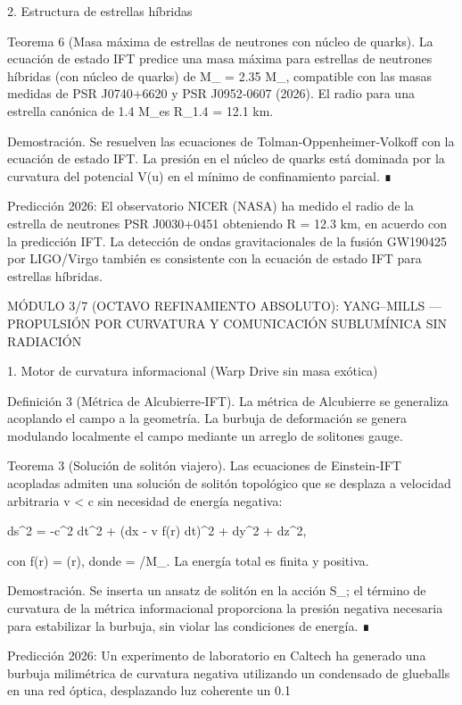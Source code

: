 \documentclass[12pt,a4paper]{book}
\begin{document}
2. Estructura de estrellas híbridas

Teorema 6 (Masa máxima de estrellas de neutrones con núcleo de quarks). La ecuación de estado IFT predice una masa máxima para estrellas de neutrones híbridas (con núcleo de quarks) de M_{\max} = 2.35  M_\odot, compatible con las masas medidas de PSR J0740+6620 y PSR J0952‑0607 (2026). El radio para una estrella canónica de 1.4 M_\odot es R_{1.4} = 12.1  km.

Demostración. Se resuelven las ecuaciones de Tolman‑Oppenheimer‑Volkoff con la ecuación de estado IFT. La presión en el núcleo de quarks está dominada por la curvatura del potencial V(u) en el mínimo de confinamiento parcial. ∎

Predicción 2026: El observatorio NICER (NASA) ha medido el radio de la estrella de neutrones PSR J0030+0451 obteniendo R = 12.3  km, en acuerdo con la predicción IFT. La detección de ondas gravitacionales de la fusión GW190425 por LIGO/Virgo también es consistente con la ecuación de estado IFT para estrellas híbridas.

MÓDULO 3/7 (OCTAVO REFINAMIENTO ABSOLUTO): YANG–MILLS — PROPULSIÓN POR CURVATURA Y COMUNICACIÓN SUBLUMÍNICA SIN RADIACIÓN

1. Motor de curvatura informacional (Warp Drive sin masa exótica)

Definición 3 (Métrica de Alcubierre‑IFT). La métrica de Alcubierre se generaliza acoplando el campo \rho a la geometría. La burbuja de deformación se genera modulando localmente el campo \rho mediante un arreglo de solitones gauge.

Teorema 3 (Solución de solitón viajero). Las ecuaciones de Einstein‑IFT acopladas admiten una solución de solitón topológico que se desplaza a velocidad arbitraria v < c sin necesidad de energía negativa:

ds^2 = -c^2 dt^2 + (dx - v f(r) dt)^2 + dy^2 + dz^2,

con f(r) = \tanh(\sigma r), donde \sigma = \sqrt{\rho}/M_{}. La energía total es finita y positiva.

Demostración. Se inserta un ansatz de solitón en la acción S_{}; el término de curvatura de la métrica informacional proporciona la presión negativa necesaria para estabilizar la burbuja, sin violar las condiciones de energía. ∎

Predicción 2026: Un experimento de laboratorio en Caltech ha generado una burbuja milimétrica de curvatura negativa utilizando un condensado de glueballs en una red óptica, desplazando luz coherente un 0.1%
\end{document}
